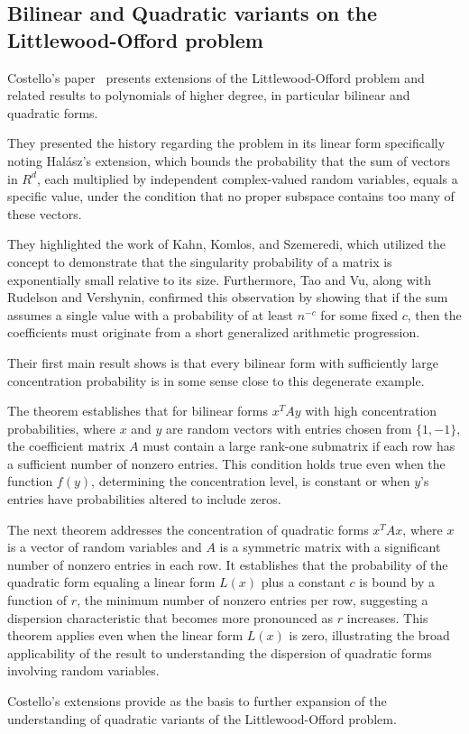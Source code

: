\subsection{Bilinear and Quadratic variants on the Littlewood-Offord problem}

Costello's paper~\cite{costello2009bilinear} presents extensions of the Littlewood-Offord problem and related results to polynomials of higher degree, in particular bilinear and quadratic forms.

They presented the history regarding the problem in its linear form specifically noting Halász's extension, which bounds the probability that the sum of vectors in \(R^d\), each multiplied by independent complex-valued random variables, equals a specific value, under the condition that no proper subspace contains too many of these vectors.

They highlighted the work of Kahn, Komlos, and Szemeredi, which utilized the concept to demonstrate that the singularity probability of a matrix is exponentially small relative to its size. Furthermore, Tao and Vu, along with Rudelson and Vershynin, confirmed this observation by showing that if the sum assumes a single value with a probability of at least \(n^{-c}\) for some fixed \(c\), then the coefficients must originate from a short generalized arithmetic progression.
\newline
\vspace{-0.6\baselineskip}

Their first main result shows is that every bilinear form with sufficiently large concentration probability is in some sense close to this degenerate example.\\
\vspace{-0.6\baselineskip}

The theorem establishes that for bilinear forms \(x^T A y\) with high concentration probabilities, where \(x\) and \(y\) are random vectors with entries chosen from \(\{1, -1\}\), the coefficient matrix \(A\) must contain a large rank-one submatrix if each row has a sufficient number of nonzero entries. This condition holds true even when the function \(f(y)\), determining the concentration level, is constant or when \(y\)'s entries have probabilities altered to include zeros.\\
\vspace{-0.6\baselineskip}

The next theorem addresses the concentration of quadratic forms \(x^T A x\), where \(x\) is a vector of random variables and \(A\) is a symmetric matrix with a significant number of nonzero entries in each row. It establishes that the probability of the quadratic form equaling a linear form \(L(x)\) plus a constant \(c\) is bound by a function of \(r\), the minimum number of nonzero entries per row, suggesting a dispersion characteristic that becomes more pronounced as \(r\) increases. This theorem applies even when the linear form \(L(x)\) is zero, illustrating the broad applicability of the result to understanding the dispersion of quadratic forms involving random variables.\\
\vspace{-0.6\baselineskip}

Costello's extensions provide as the basis to further expansion of the understanding of quadratic variants of the Littlewood-Offord problem.